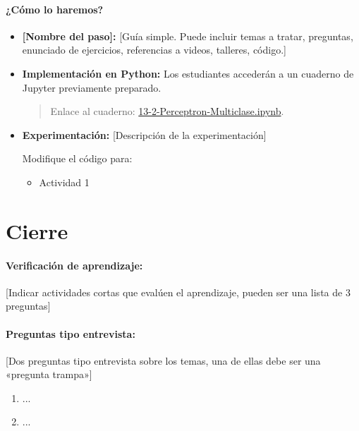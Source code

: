 \documentclass[a4,11pt]{aleph-notas}
\begin{document}
\paragraph{¿Cómo lo haremos?}  
\begin{itemize}[leftmargin=*]
    \item \textbf{[Nombre del paso]:}  %
    [Guía simple. Puede incluir temas a tratar, preguntas, enunciado de ejercicios, referencias a videos, talleres, código.]
    \item \textbf{Implementación en Python:} Los estudiantes accederán a un cuaderno de Jupyter previamente preparado.
    \begin{quote}
        Enlace al cuaderno: \href{https://github.com/andres-merino/AprendizajeAutomaticoInicial-05-N0105/blob/main/2-Notebooks/13-2-Perceptron-Multiclase.ipynb}{13-2-Perceptron-Multiclase.ipynb}.
    \end{quote}
    \item \textbf{Experimentación:} 
    [Descripción de la experimentación]
    \begin{ejer}
    Modifique el código para:
    \begin{itemize}[leftmargin=*]
        \item Actividad 1
    \end{itemize}
    \end{ejer}
\end{itemize}

\section*{Cierre}

\paragraph{Verificación de aprendizaje:} [Indicar actividades cortas que evalúen el aprendizaje, pueden ser una lista de 3 preguntas]

\paragraph{Preguntas tipo entrevista:} [Dos preguntas tipo entrevista sobre los temas, una de ellas debe ser una «pregunta trampa»]
\begin{enumerate}[leftmargin=*]
    \item ...
    \item ...
\end{enumerate}
\end{document}
